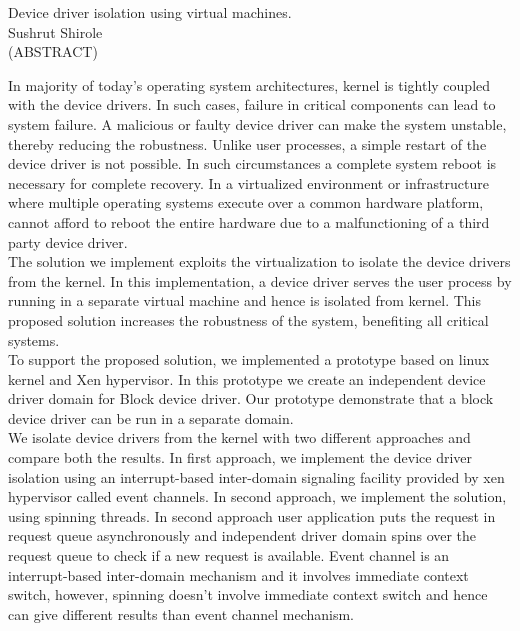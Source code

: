 \documentclass[12pt]{report}
\begin{document}
\thispagestyle{empty}
\begin{center}

{\large 
Device driver isolation using virtual machines.
}
\\[10mm]
Sushrut Shirole
\\[10mm]
(ABSTRACT)
\end{center}
In majority of today's operating system architectures, kernel is tightly coupled with the device drivers. In such cases, failure in critical components can lead to system failure.
A malicious or faulty device driver can make the system unstable, thereby reducing the robustness. Unlike user processes, a simple restart of the device driver is not possible. In such circumstances a complete system reboot is necessary for complete recovery. In a virtualized environment or infrastructure where multiple operating systems execute over a common hardware platform, cannot afford to reboot the entire hardware due to a malfunctioning of a third party device driver. 
\\[3mm] 
The solution we implement exploits the virtualization to isolate the device drivers from the kernel. In this implementation, a device driver serves the user process by running in a separate virtual machine and hence is isolated from kernel. This proposed solution increases the robustness of the system, benefiting all critical systems.
\\[3mm]
To support the proposed solution, we implemented a prototype based on linux kernel and Xen hypervisor. In this prototype we create an independent device driver domain for Block device driver. Our prototype demonstrate that a block device driver can be run in a separate domain. 
\\[3mm]
We isolate device drivers from the kernel with two different approaches and compare both the results. In first approach, we implement the device driver isolation using an interrupt-based inter-domain signaling facility provided by xen hypervisor called event channels. In second approach, we implement the solution, using spinning threads. In second approach user application puts the request in request queue asynchronously and independent driver domain spins over the request queue to check if a new request is available. Event channel is an interrupt-based inter-domain mechanism and it involves immediate context switch, however, spinning doesn't involve immediate context switch and hence can give different results than event channel mechanism. 
\vfill

\end{document}
